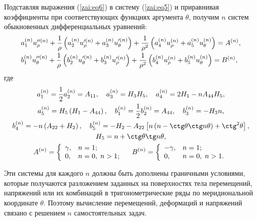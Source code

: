 Подставляя выражения (\ref{zai:eq6}) в систему (\ref{zai:eq5}) и приравнивая
коэффициенты при соответствующих функциях аргумента $\theta $,
получим $n$ систем обыкновенных дифференциальных уравнений:
\begin{equation}
\label{zai:eq7} 
\begin{array}{l}
\displaystyle
a^{(n)}_{1} {u}''^{(n)}_{\rho}
+ \frac{1}{\rho} \left( {a^{(n)}_{2} {u}'^{\left( n
\right)}_{\rho} + a^{(n)}_{3} {u}'^{\left( n
\right)}_{\theta}} \right) + \frac{1}{\rho^2} \left( {a^{\left( n
\right)}_{4} u^{(n)}_{\rho}  + a^{(n)}_{5}
u^{(n)}_{\theta}} \right) = A^{(n)} , \vspace{1mm}
\\
\displaystyle
 b^{(n)}_{1} {u}''^{(n)}_{\theta} +
\frac{1}{\rho} \left( {b^{(n)}_{2} {u}'^{\left( n
\right)}_{\theta} + b^{(n)}_{3} {u}'^{\left( n
\right)}_{\rho}} \right)+ \frac{1}{\rho^2} \left( {b^{\left( n
\right)}_{4} u^{(n)}_{\rho} + b^{(n)}_{5}
u^{(n)}_{\theta}} \right)  = B^{(n)} ,
\end{array}
\end{equation}
\noindent где
\begin{gather*}
 a^{(n)}_{1} = \frac{1}{2} a^{(n)}_{2} = A_{11} , \quad  a^{\left(
n \right)}_{3} = H_{3} H_{5}, \quad a^{(n)}_{4} =
2H_{1} - n A_{44} H_{5},
\\
a^{(n)}_{5} = H_{5}
\left( { H_{1} - A_{44} } \right), \quad b^{(n)}_{1} =
\frac{1}{2} b^{(n)}_{2} = A_{44} , \quad  b^{\left( n
\right)}_{3} = - H_{3} n,
\\
 b^{(n)}_{4} = - n \left( {A_{22} + H_{2} } \right),
\quad b^{(n)}_{5} = - H_{2} - A_{22} \left[ {n \left(
{n - \ctg\theta \ctg n\theta } \right) + \ctg^2\theta } \right],
\\
 H_{5} = n + \ctg\theta \tg n\theta,
\\
 A^{(n)} = \left\{ {{\begin{array}{*{20}c}
 {\gamma ,} \hfill & {n = 1 ;} \hfill \\
 {0,} \hfill & {n = 0, \; n > 1 ;} \hfill \\
\end{array} }} \right.
\quad B^{(n)} = \left\{ {{\begin{array}{*{20}c}
 { - \gamma ,} \hfill & {n = 1 ;} \hfill \\
 {0,} \hfill & {n = 0, \; n > 1 .} \hfill \\
\end{array} }} \right.
\end{gather*}

Эти системы для каждого $n$ должны быть дополнены граничными
условиями, которые получаются разложением заданных на поверхностях
тела перемещений, напряжений или их комбинаций в тригонометрические
ряды по меридиональной координате $\theta $. Поэтому вычисление
перемещений, деформаций и напряжений связано с решением $n$
самостоятельных задач.

